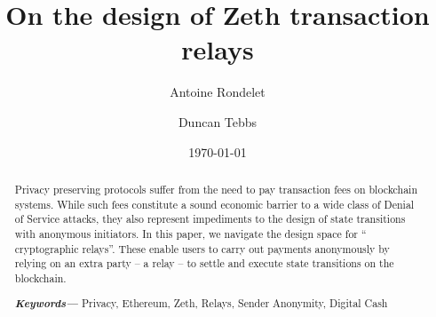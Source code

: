 \documentclass[11pt,a4paper,oneside]{report}
\title{On the design of Zeth transaction relays}
\author[*]{Antoine Rondelet}
\author[*]{Duncan Tebbs}
\affil[*]{Clearmatics, UK}
\date{\today}
\providecommand{\keywords}[1]{\textbf{\textit{Keywords---}} #1}
\begin{document}
\maketitle

\begin{abstract}
Privacy preserving protocols suffer from the need to pay transaction fees on blockchain systems. While such fees constitute a sound economic barrier to a wide class of Denial of Service attacks, they also represent impediments to the design of state transitions with anonymous initiators. In this paper, we navigate the design space for ``\zeth{} cryptographic relays''. These enable \zeth{} users to carry out \zeth{} payments anonymously by relying on an extra party -- a relay -- to settle and execute state transitions on the blockchain.

\keywords{Privacy, Ethereum, Zeth, Relays, Sender Anonymity, Digital Cash}
\end{abstract}

\tableofcontents





\appendix






\end{document}
